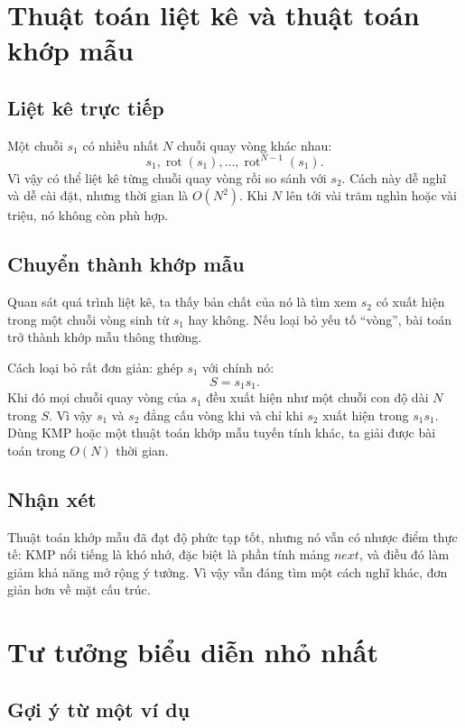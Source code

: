 \documentclass[11pt]{article}
\begin{document}
\section{Thuật toán liệt kê và thuật toán khớp mẫu}

\subsection{Liệt kê trực tiếp}

Một chuỗi \(s_1\) có nhiều nhất \(N\) chuỗi quay vòng khác nhau:
\[
  s_1,\operatorname{rot}(s_1),\ldots,\operatorname{rot}^{N-1}(s_1).
\]
Vì vậy có thể liệt kê từng chuỗi quay vòng rồi so sánh với \(s_2\). Cách này
dễ nghĩ và dễ cài đặt, nhưng thời gian là \(O(N^2)\). Khi \(N\) lên tới vài
trăm nghìn hoặc vài triệu, nó không còn phù hợp.

\subsection{Chuyển thành khớp mẫu}

Quan sát quá trình liệt kê, ta thấy bản chất của nó là tìm xem \(s_2\) có
xuất hiện trong một chuỗi vòng sinh từ \(s_1\) hay không. Nếu loại bỏ yếu tố
``vòng'', bài toán trở thành khớp mẫu thông thường.

Cách loại bỏ rất đơn giản: ghép \(s_1\) với chính nó:
\[
  S=s_1s_1.
\]
Khi đó mọi chuỗi quay vòng của \(s_1\) đều xuất hiện như một chuỗi con độ dài
\(N\) trong \(S\). Vì vậy \(s_1\) và \(s_2\) đẳng cấu vòng khi và chỉ khi
\(s_2\) xuất hiện trong \(s_1s_1\). Dùng KMP hoặc một thuật toán khớp mẫu tuyến
tính khác, ta giải được bài toán trong \(O(N)\) thời gian.

\subsection{Nhận xét}

Thuật toán khớp mẫu đã đạt độ phức tạp tốt, nhưng nó vẫn có nhược điểm thực
tế: KMP nổi tiếng là khó nhớ, đặc biệt là phần tính mảng \(\mathit{next}\),
và điều đó làm giảm khả năng mở rộng ý tưởng. Vì vậy vẫn đáng tìm một cách
nghĩ khác, đơn giản hơn về mặt cấu trúc.

\section{Tư tưởng biểu diễn nhỏ nhất}

\subsection{Gợi ý từ một ví dụ}
\end{document}
